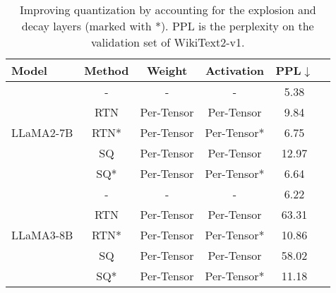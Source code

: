 \begin{table}[t]
    \caption{Improving quantization by accounting for the explosion and decay layers (marked with *).
    PPL is the perplexity on the validation set of WikiText2-v1.
    }\label{tab:quantization} \vspace{-0.2cm}
    \begin{center}
        \begin{small}
            \begin{sc}
                \setlength{\tabcolsep}{2pt}
                \begin{tabular}{lccccr}
                    \toprule
                    Model                       & Method & Weight     & Activation  & PPL\(\downarrow\) \\
                    \midrule
                    \multirow{ 5}{*}{LLaMA2-7B} & -      & -          & -           & 5.38              \\
                                                & RTN    & Per-Tensor & Per-Tensor  & 9.84              \\
                                                & RTN*   & Per-Tensor & Per-Tensor* & 6.75              \\
                                                & SQ     & Per-Tensor & Per-Tensor  & 12.97             \\
                                                & SQ*    & Per-Tensor & Per-Tensor* & 6.64              \\
                    \midrule
                    \multirow{ 5}{*}{LLaMA3-8B} & -      & -          & -           & 6.22              \\
                                                & RTN    & Per-Tensor & Per-Tensor  & 63.31             \\
                                                & RTN*   & Per-Tensor & Per-Tensor* & 10.86             \\
                                                & SQ     & Per-Tensor & Per-Tensor  & 58.02             \\
                                                & SQ*    & Per-Tensor & Per-Tensor* & 11.18             \\
                    \bottomrule
                \end{tabular}
            \end{sc}
        \end{small}
    \end{center}
\end{table}
\vspace{-0.5em}

